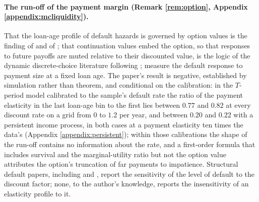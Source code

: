 \paragraph{The run-off of the payment margin (Remark \ref{rem:option}, Appendix \ref{appendix:mcliquidity}).} That the loan-age profile of default hazards is governed by option values is the finding of \citet{deng_mortgage_2000} and of \citet{campbell_model_2015}; that continuation values embed the option, so that responses to future payoffs are muted relative to their discounted value, is the logic of the dynamic discrete-choice literature following \citet{rust_optimal_1987}; \citet{fuster_payment_2017} measure the default response to payment size at a fixed loan age. The paper's result is negative, established by simulation rather than theorem, and conditional on the calibration: in the $T$-period model calibrated to the sample's default rate the ratio of the payment elasticity in the last loan-age bin to the first lies between $0.77$ and $0.82$ at every discount rate on a grid from $0$ to $1.2$ per year, and between $0.20$ and $0.22$ with a persistent income process, in both cases at a payment elasticity ten times the data's (Appendix \ref{appendix:persistent}); within those calibrations the shape of the run-off contains no information about the rate, and a first-order formula that includes survival and the marginal-utility ratio but not the option value attributes the option's truncation of far payments to impatience. Structural default papers, including \citet{chatterjee_quantitative_2007} and \citet{athreya_persistence_2019}, report the sensitivity of the level of default to the discount factor; none, to the author's knowledge, reports the insensitivity of an elasticity profile to it.
